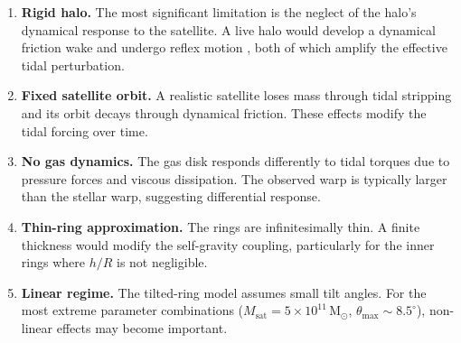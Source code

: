\begin{enumerate}
    \item \textbf{Rigid halo.} The most significant limitation is the neglect of the halo's dynamical response to the satellite. A live halo would develop a dynamical friction wake \citep{garavitocamargo2019} and undergo reflex motion \citep{vasiliev2023}, both of which amplify the effective tidal perturbation.
    
    \item \textbf{Fixed satellite orbit.} A realistic satellite loses mass through tidal stripping and its orbit decays through dynamical friction. These effects modify the tidal forcing over time.
    
    \item \textbf{No gas dynamics.} The gas disk responds differently to tidal torques due to pressure forces and viscous dissipation. The observed  warp is typically larger than the stellar warp, suggesting differential response.
    
    \item \textbf{Thin-ring approximation.} The rings are infinitesimally thin. A finite thickness would modify the self-gravity coupling, particularly for the inner rings where $h/R$ is not negligible.
    
    \item \textbf{Linear regime.} The tilted-ring model assumes small tilt angles. For the most extreme parameter combinations ($M_\mathrm{sat}=5\times10^{11}\,\mathrm{M}_\odot$, $\theta_\mathrm{max}\sim8.5^\circ$), non-linear effects may become important.
\end{enumerate}
